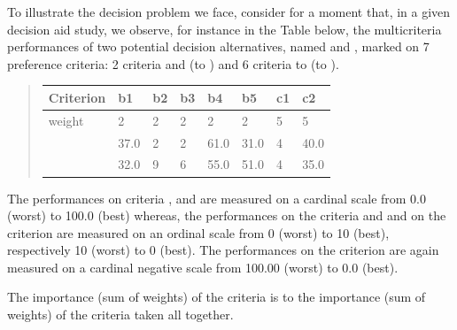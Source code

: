 \documentclass[a4paper,12pt,english]{sphinxhowto}
\begin{document}
To illustrate the decision problem we face, consider for a moment that, in a given decision aid study, we observe, for instance in the Table below, the multi\sphinxhyphen{}criteria performances of two potential decision alternatives, named  and , marked on 7  preference criteria: 2  criteria  and  (to ) and 6  criteria  to  (to ).
\begin{quote}


\begin{savenotes}\sphinxattablestart
\centering
\begin{tabulary}{\linewidth}[t]{|T|T|T|T|T|T|T|T|}
\hline
\sphinxstyletheadfamily 
Criterion
&\sphinxstyletheadfamily 
b1
&\sphinxstyletheadfamily 
b2
&\sphinxstyletheadfamily 
b3
&\sphinxstyletheadfamily 
b4
&\sphinxstyletheadfamily 
b5
&\sphinxstyletheadfamily 
c1
&\sphinxstyletheadfamily 
c2
\\
\hline
weight
&
2
&
2
&
2
&
2
&
2
&
5
&
5
\\
\hline
{}
&
37.0
&
2
&
2
&
61.0
&
31.0
&
\sphinxhyphen{}4
&
\sphinxhyphen{}40.0
\\
\hline
{}
&
32.0
&
9
&
6
&
55.0
&
51.0
&
\sphinxhyphen{}4
&
\sphinxhyphen{}35.0
\\
\hline
\end{tabulary}
\par
\sphinxattableend\end{savenotes}
\end{quote}

The performances on  criteria ,  and  are measured on a cardinal scale from 0.0 (worst) to 100.0 (best) whereas, the performances on the  criteria  and   and on the  criterion  are measured on an ordinal scale from 0 (worst) to 10 (best), respectively \sphinxhyphen{}10 (worst) to 0 (best). The performances on the  criterion  are again measured on a cardinal negative scale from \sphinxhyphen{}100.00 (worst) to 0.0 (best).

The importance (sum of weights) of the  criteria is  to the importance (sum of weights) of the  criteria taken all together.
\end{document}
